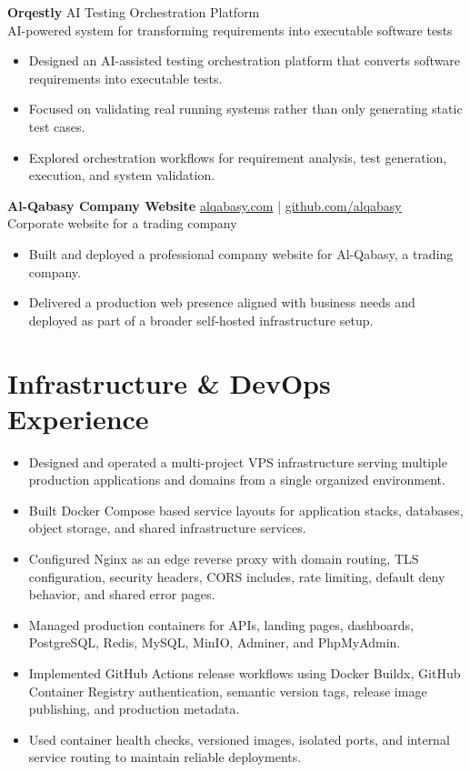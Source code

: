 \documentclass[10pt,a4paper]{article}
\newcommand{\project}[3]{
  \textbf{\color{heading} #1} \hfill {\small \color{muted} #2}\\
  {\small \color{muted} #3}
  \vspace{2pt}
}
\begin{document}
\vspace{4pt}

\project
  {Orqestly}
  {AI Testing Orchestration Platform}
  {AI-powered system for transforming requirements into executable software tests}

\begin{itemize}
  \item Designed an AI-assisted testing orchestration platform that converts software requirements into executable tests.
  \item Focused on validating real running systems rather than only generating static test cases.
  \item Explored orchestration workflows for requirement analysis, test generation, execution, and system validation.
\end{itemize}

\vspace{4pt}

\project
  {Al-Qabasy Company Website}
  {\href{https://alqabasy.com}{alqabasy.com} \; | \; \href{https://github.com/alqabasy}{github.com/alqabasy}}
  {Corporate website for a trading company}

\begin{itemize}
  \item Built and deployed a professional company website for Al-Qabasy, a trading company.
  \item Delivered a production web presence aligned with business needs and deployed as part of a broader self-hosted infrastructure setup.
\end{itemize}

\section*{Infrastructure \& DevOps Experience}

\begin{itemize}
  \item Designed and operated a multi-project VPS infrastructure serving multiple production applications and domains from a single organized environment.
  \item Built Docker Compose based service layouts for application stacks, databases, object storage, and shared infrastructure services.
  \item Configured Nginx as an edge reverse proxy with domain routing, TLS configuration, security headers, CORS includes, rate limiting, default deny behavior, and shared error pages.
  \item Managed production containers for APIs, landing pages, dashboards, PostgreSQL, Redis, MySQL, MinIO, Adminer, and PhpMyAdmin.
  \item Implemented GitHub Actions release workflows using Docker Buildx, GitHub Container Registry authentication, semantic version tags, release image publishing, and production metadata.
  \item Used container health checks, versioned images, isolated ports, and internal service routing to maintain reliable deployments.
\end{itemize}
\end{document}
